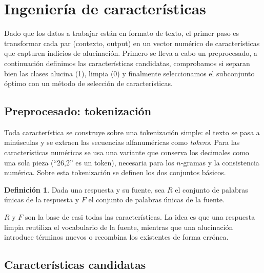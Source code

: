 \documentclass[12pt,a4paper]{report}
\theoremstyle{definition}
\newtheorem{definicion}{Definición}
\begin{document}

\section{Ingeniería de características}
\label{sec:fe}
Dado que los datos a trabajar están en formato de texto, el primer paso es transformar cada par (contexto, output) en un vector numérico de características que capturen indicios de alucinación. Primero se lleva a cabo un preprocesado, a continuación definimos las características candidatas,
comprobamos si separan bien las clases alucina (1), limpia (0) y finalmente seleccionamos el subconjunto óptimo con un método de selección de características.

\subsection{Preprocesado: tokenización}

Toda característica se construye sobre una tokenización simple: el texto se pasa a
minúsculas y se extraen las secuencias alfanuméricas como \emph{tokens}. Para las
características numéricas se usa una variante que conserva los decimales como una sola pieza
(``26,2'' es un token), necesaria para los $n$-gramas y la consistencia numérica. Sobre
esta tokenización se definen los dos conjuntos básicos.

\begin{definicion}
Dada una respuesta y su fuente, sea $R$ el conjunto de palabras únicas de la respuesta y
$F$ el conjunto de palabras únicas de la fuente.
\end{definicion}

$R$ y $F$ son la base de casi todas las características. La idea es que una
respuesta limpia reutiliza el vocabulario de la fuente, mientras que una alucinación
introduce términos nuevos o recombina los existentes de forma errónea.

\subsection{Características candidatas}
\label{sec:catalogo}
\end{document}
